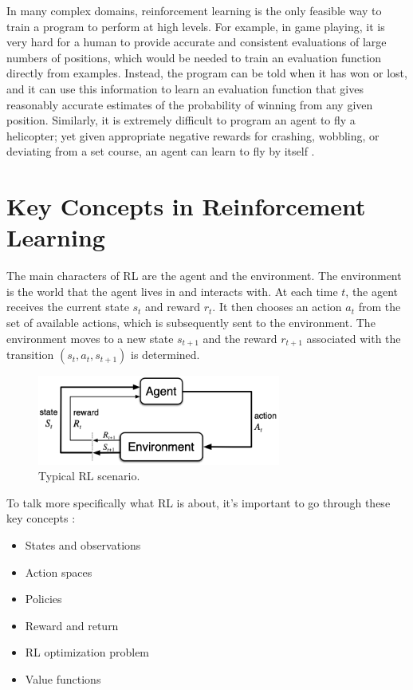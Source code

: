 \documentclass{article}
\begin{document}
In many complex domains, reinforcement learning is the only feasible way to train a program to perform at high levels. For example, in game playing, it is very hard for a human to provide accurate and consistent evaluations of large numbers of positions, which would be needed to train an evaluation function directly from examples. Instead, the program can be told when it has won or lost, and it can use this information to learn an evaluation function that gives reasonably accurate estimates of the probability of winning from any given position. Similarly, it is extremely difficult to program an agent to fly a helicopter; yet given appropriate negative rewards for crashing, wobbling, or deviating from a set course, an agent can learn to fly by itself \cite{russell2016artificial}.


\section{Key Concepts in Reinforcement Learning}

The main characters of RL are the agent and the environment. The environment is the world that the agent lives in and interacts with. At each time $t$, the agent receives the current state $s_t$ and reward $r_t$. It then chooses an action $a_t$ from the set of available actions, which is subsequently sent to the environment. The environment moves to a new state $s_{t+1}$ and the reward $r_{t+1}$ associated with the transition $(s_{t},a_{t},s_{t+1})$ is determined.

\begin{figure}
	\centering
	\includegraphics[width=8cm]{rl-loop.png}
	\caption{Typical RL scenario. \cite{10.5555/3312046}}
	\label{fig:rl-loop}
\end{figure}

To talk more specifically what RL is about, it's important to go through these key concepts \cite{SpinningUp2018}: 

\begin{itemize}
	\item States and observations
	\item Action spaces
	\item Policies
	\item Reward and return
	\item RL optimization problem
	\item Value functions
\end{itemize}
\end{document}
